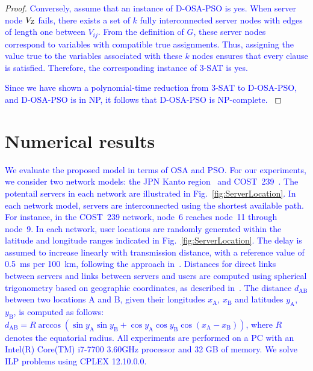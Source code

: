 \documentclass[10pt, letterpaper]{IEEEtran}
\newcommand\blue[1]{\textcolor{blue}{#1}}
\begin{document}
\begin{CJK}{UTF8}{ipxm}
\begin{proof}
  \blue{
  Conversely, assume that an instance of D-OSA-PSO is yes.
  When server node $V_{\rm Z}$ fails, there exists a set of $k$ fully interconnected server nodes with edges of length one between $V_{ij}$.
  From the definition of $G$, these server nodes correspond to variables with compatible true assignments.
  Thus, assigning the value true to the variables associated with these $k$ nodes ensures that every clause is satisfied.
  Therefore, the corresponding instance of 3-SAT is yes.
  }

  \blue{
  Since we have shown a polynomial-time reduction from 3-SAT to D-OSA-PSO, and D-OSA-PSO is in NP, it follows that D-OSA-PSO is NP-complete.
  }
\end{proof}

\section{Numerical results}
\label{sec:numerical_results}
\blue{
We evaluate the proposed model in terms of OSA and PSO.
% 
For our experiments, we consider two network models: the JPN Kanto region~\cite{JPN} and COST~239~\cite{COST}. 
The potentail servers in each network are illustrated in Fig.~\ref{fig:ServerLocation}.
In each network model, servers are interconnected using the shortest available path.
For instance, in the COST~239 network, node~6 reaches node~11 through node~9.
In each network, user locations are randomly generated within the latitude and longitude ranges indicated in Fig.~\ref{fig:ServerLocation}.
The delay is assumed to increase linearly with transmission distance, with a reference value of 0.5~ms per 100~km, following the approach in~\cite{KawabataICC2023}.
Distances for direct links between servers and links between servers and users are computed using spherical trigonometry based on geographic coordinates, as described in~\cite{12Imanaka2024}.
The distance $d_\mathrm{AB}$ between two locations A and B, given their longitudes $x_\mathrm{A}$, $x_\mathrm{B}$ and latitudes $y_\mathrm{A}$, $y_\mathrm{B}$, is computed as follows:
$d_\mathrm{AB} = R \arccos\left( \sin y_\mathrm{A} \sin y_\mathrm{B} + \cos y_\mathrm{A} \cos y_\mathrm{B} \cos(x_\mathrm{A} - x_\mathrm{B}) \right)$,
where $R$ denotes the equatorial radius.
All experiments are performed on a PC with an Intel(R) Core(TM) i7-7700 3.60GHz processor and 32 GB of memory.
We solve ILP problems using CPLEX 12.10.0.0\cite{CPLEX}.
\begin{figure}[t]
  \begin{center}

\end{center}
\end{figure}}
\end{CJK}
\end{document}
